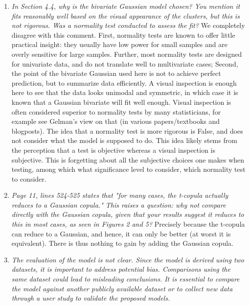 \documentclass{article}
\begin{document}
\begin{enumerate}
    \item \textit{In Section 4.4, why is the bivariate Gaussian model chosen? You mention it fits reasonably well based on the visual appearance of the clusters, but this is not rigorous. Was a normality test conducted to assess the fit?} We completely disagree with this comment. First, normality tests are known to offer little practical insight: they usually have low power for small samples and are overly sensitive for large samples. Further, most normality tests are designed for univariate data, and do not translate well to multivariate cases; Second, the point of the bivariate Gaussian used here is not to achieve perfect prediction, but to summarize data efficiently. A visual inspection is enough here to see that the data looks unimodal and symmetric, in which case it is known that a Gaussian bivariate will fit well enough. Visual inspection is often considered superior to normality tests by many statisticians, for example see Gelman's view on that (in various papers/textbooks and blogposts). The idea that a normality test is more rigorous is False, and does not consider what the model is supposed to do. This idea likely stems from the perception that a test is objective whereas a visual inspection is subjective. This is forgetting about all the subjective choices one makes when testing, among which what significance level to consider, which normality test to consider.
    \item \textit{Page 11, lines 524-525 states that "for many cases, the t-copula actually reduces to a Gaussian copula." This raises a question: why not compare directly with the Gaussian copula, given that your results suggest it reduces to this in most cases, as seen in Figures 2 and 5?} Precisely because the t-copula can reduce to a Gaussian, and hence, it can only be better (at worst it is equivalent). There is thus nothing to gain by adding the Gaussian copula.
    \item \textit{The evaluation of the model is not clear. Since the model is derived using two datasets, it is important to address potential bias. Comparisons using the same dataset could lead to misleading conclusions. It is essential to compare the model against another publicly available dataset or to collect new data through a user study to validate the proposed models.}
\end{enumerate}



\end{document}
